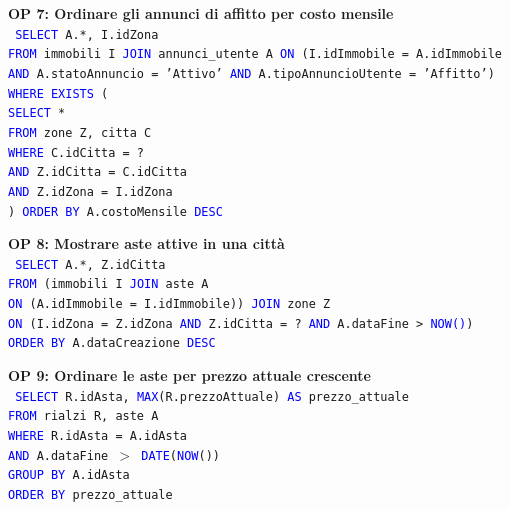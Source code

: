 \documentclass[a4paper,12pt]{report}
\begin{document}
            \noindent
            \textbf{OP 7: Ordinare gli annunci di affitto per costo mensile} \\
            \texttt{
                \textcolor{blue}{SELECT} A.*, I.idZona \\
                \textcolor{blue}{FROM} immobili I \textcolor{blue}{JOIN} annunci\_utente A \textcolor{blue}{ON} (I.idImmobile = A.idImmobile \textcolor{blue}{AND} A.statoAnnuncio = 'Attivo' \textcolor{blue}{AND} A.tipoAnnuncioUtente = 'Affitto') \\
                \textcolor{blue}{WHERE EXISTS} (\\
                    \null\qquad \textcolor{blue}{SELECT} * \\
                    \null\qquad \textcolor{blue}{FROM} zone Z, citta C \\
                    \null\qquad \textcolor{blue}{WHERE} C.idCitta = ? \\
                    \null\qquad \textcolor{blue}{AND} Z.idCitta = C.idCitta \\
                    \null\qquad \textcolor{blue}{AND} Z.idZona = I.idZona\\
                    ) \textcolor{blue}{ORDER BY} A.costoMensile \textcolor{blue}{DESC} \\
            }
            
            \noindent
            \textbf{OP 8: Mostrare aste attive in una città} \\
            \texttt{
                \textcolor{blue}{SELECT} A.*, Z.idCitta \\
                \textcolor{blue}{FROM} (immobili I \textcolor{blue}{JOIN} aste A \\ 
                \textcolor{blue}{ON} (A.idImmobile = I.idImmobile)) \textcolor{blue}{JOIN} zone Z \\ 
                \textcolor{blue}{ON} (I.idZona = Z.idZona \textcolor{blue}{AND} Z.idCitta = ? \textcolor{blue}{AND} A.dataFine > \textcolor{blue}{NOW()}) \\
                \textcolor{blue}{ORDER BY} A.dataCreazione  \textcolor{blue}{DESC} \\
            }
            
            \noindent
            \textbf{OP 9: Ordinare le aste per prezzo attuale crescente} \\
            \texttt{
                \textcolor{blue}{SELECT} R.idAsta, \textcolor{blue}{MAX}(R.prezzoAttuale) \textcolor{blue}{AS} prezzo\_attuale \\
                \textcolor{blue}{FROM} rialzi R, aste A \\
                \textcolor{blue}{WHERE} R.idAsta = A.idAsta \\
                \textcolor{blue}{AND} A.dataFine $>$ \textcolor{blue}{DATE}(\textcolor{blue}{NOW}()) \\
                \textcolor{blue}{GROUP BY} A.idAsta \\
                \textcolor{blue}{ORDER BY} prezzo\_attuale \\
            }
\end{document}
